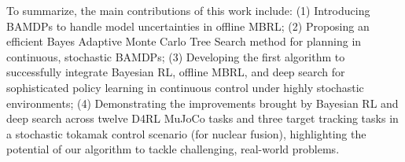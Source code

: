 To summarize, the main contributions of this work include: 
(1) Introducing BAMDPs to handle model uncertainties in offline MBRL;
(2) Proposing an efficient Bayes Adaptive Monte Carlo Tree Search method for planning in continuous, stochastic BAMDPs;
(3) Developing the first algorithm to successfully integrate Bayesian RL, offline MBRL, and deep search for sophisticated policy learning in continuous control under highly stochastic environments;
(4) Demonstrating the improvements brought by Bayesian RL and deep search across twelve D4RL MuJoCo tasks and three target tracking tasks in a stochastic tokamak control scenario (for nuclear fusion), highlighting the potential of our algorithm to tackle challenging, real-world problems.